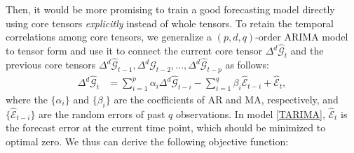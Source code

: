 \documentclass[letterpaper]{article} %
\numberwithin{theorem}{section}
\newcommand{\ten}[1]{ \boldsymbol{\mathcal #1}}
\begin{document}
Then, it would be more promising to train a good forecasting model  directly using   core tensors  \textit{explicitly} instead of whole  tensors. To   retain the temporal correlations  among core tensors, we generalize  a $(p,d,q)$-order  ARIMA model to tensor form and use it to   connect  the current core tensor ${ \Delta^d  \widehat{\ten{G}}_t} $ and the previous core tensors
${\Delta^d  \widehat{\ten{G}}_{t-1}},\Delta^d  {\widehat{\ten{G}}_{t-2}}, \ldots, \Delta^d  {\widehat{\ten{G}}_{t-p}}$ as follows:
\begin{equation} \label{TARIMA}
\begin{aligned}
\Delta^d  {\widehat{\ten{G}}_{t}}    & =  \sum_{i=1}^{p} \alpha_i  {\Delta^d   \widehat{\ten{G}}_{t-i}}  - \sum_{i=1}^{q} \beta_i {\widehat{\ten{E}}_{t-i}} + \widehat{\ten{E}}_t, 
\end{aligned}
\end{equation}
where the  $\{\alpha_i \}$ and  $\{\beta_i\}$  are the coefficients of AR and MA, respectively, and $\{\widehat{\ten{E}}_{t-i}\}$ are the random errors of past $q$ observations.  In model \eqref{TARIMA}, $\widehat{\ten{E}}_t$ is the forecast error at the current time point, which should be minimized  to optimal  zero. We  thus can derive the following  objective function:
\end{document}
